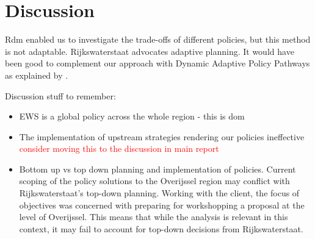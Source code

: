 \section{Discussion}
\label{s:discussion}




Rdm enabled us to investigate the trade-offs of different policies, but this method is not adaptable. Rijkswaterstaat advocates adaptive planning. It would have been good to complement our approach with Dynamic Adaptive Policy Pathways as explained by \cite{kwakkel_coping_2016}.

Discussion stuff to remember:
\begin{itemize}
    \item EWS is a global policy across the whole region - this is dom
    \item The implementation of upstream strategies rendering our policies ineffective \textcolor{red}{consider moving this to the discussion in main report}
    \item Bottom up vs top down planning and implementation of policies. Current scoping of the policy solutions to the Overijssel region may conflict with Rijkswaterstaat's top-down planning. Working with the client, the focus of objectives was concerned with preparing for workshopping a proposal at the level of Overijssel. This means that while the analysis is relevant in this context, it may fail to account for top-down decisions from Rijkswaterstaat.
\end{itemize}